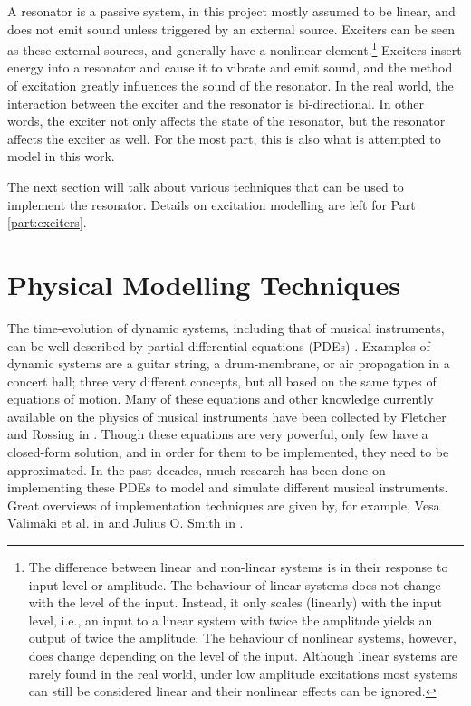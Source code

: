A resonator is a passive system, in this project  mostly assumed to be linear, and does not emit sound unless triggered by an external source. Exciters can be seen as these external sources, and generally have a nonlinear element.\footnote{The difference between linear and non-linear systems is in their response to input level or amplitude. The behaviour of linear systems does not change with the level of the input. Instead, it only scales (linearly) with the input level, i.e., an input to a linear system with twice the amplitude yields an output of twice the amplitude. The behaviour of nonlinear systems, however, does change depending on the level of the input. Although linear systems are rarely found in the real world, under low amplitude excitations most systems can still be considered linear and their nonlinear effects can be ignored.} Exciters insert energy into a resonator and cause it to vibrate and emit sound, and the method of excitation greatly influences the sound of the resonator. In the real world, the interaction between the exciter and the resonator is bi-directional. In other words, the exciter not only affects the state of the resonator, but the resonator affects the exciter as well. For the most part, this is also what is attempted to model in this work.

The next section will talk about various techniques that can be used to implement the resonator. Details on  excitation modelling are left for Part \ref{part:exciters}.

\section{Physical Modelling Techniques}\label{sec:physModTech}
The time-evolution of dynamic systems, including that of musical instruments, can be well described by partial differential equations (PDEs) \cite{Fletcher1998, theBible}. Examples of dynamic systems are a guitar string, a drum-membrane, or air propagation in a concert hall; three very different concepts, but all based on the same types of equations of motion. Many of these equations and other knowledge currently available on the physics of musical instruments have been collected by Fletcher and Rossing in \cite{Fletcher1998}. Though these equations are very powerful, only few have a closed-form solution, and in order for them to be implemented, they need to be approximated. In the past decades, much research has been done on implementing these PDEs to model and simulate different musical instruments. Great overviews of implementation techniques are given by, for example, Vesa V{\"a}lim{\"a}ki et al. in \cite{Valimaki2006} and Julius O. Smith in \cite{Smith2010a, Smith2010b}. 
\\

